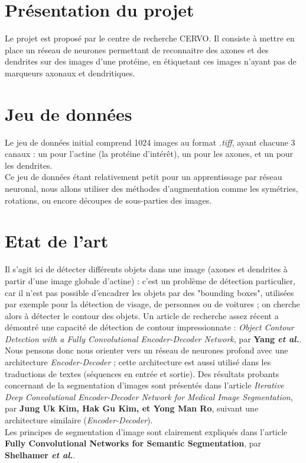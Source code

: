 \documentclass{report}
\begin{document}
\section{Présentation du projet}

Le projet est proposé par le centre de recherche CERVO. Il consiste à mettre en
place un réseau de neurones permettant de reconnaitre des axones et des dendrites
sur des images d’une protéine, en étiquetant ces images n’ayant pas de marqueurs
axonaux et dendritiques.

\section{Jeu de données}

Le jeu de données initial comprend 1024 images au format \textit{.tiff}, ayant
chacune 3 canaux : un pour l'actine (la protéine d'intérêt), un pour les axones,
et un pour les dendrites. \\
Ce jeu de données étant relativement petit pour un apprentissage par réseau neuronal,
nous allons utiliser des méthodes d'augmentation comme les symétries, rotations, ou
encore découpes de sous-parties des images.

\section{Etat de l'art}

Il s'agit ici de détecter différents objets dans une image (axones et dendrites
à partir d'une image globale d'actine) : c'est un problème de détection particulier,
car il n'est pas possible d'encadrer les objets par des "bounding boxes", utilisées
par exemple pour la détection de visage, de personnes ou de voitures ; on cherche
alors à détecter le contour des objets. Un article de recherche assez récent a
démontré une capacité de détection de contour impressionnate : \textit{Object Contour
Detection with a Fully Convolutional Encoder-Decoder Network}, par \textbf{Yang
\textit{et al.}}. Nous pensons donc nous orienter vers un réseau de neurones profond
avec une architecture \textit{Encoder-Decoder} ; cette architecture est aussi
utilisé dans les traductions de textes (séquences en entrée et sortie). Des résultats
probants concernant de la segmentation d'images sont présentés dans l'article
\textit{Iterative Deep Convolutional Encoder-Decoder Network for Medical Image
Segmentation}, par \textbf{Jung Uk Kim, Hak Gu Kim, et Yong Man Ro}, suivant une
architecture similaire (\textit{Encoder-Decoder}). \\
Les principes de segmentation d'image sont clairement expliqués dans l'article
\textbf{Fully Convolutional Networks for Semantic Segmentation}, par \textbf{Shelhamer
\textit{et al.}}.
\end{document}
